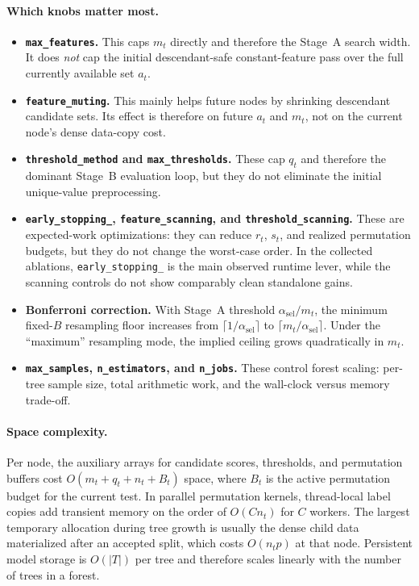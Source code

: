 \paragraph{Which knobs matter most.}
\begin{itemize}
  \item \textbf{\texttt{max\_features}.} This caps $m_t$ directly and therefore
  the Stage~A search width. It does \emph{not} cap the initial descendant-safe
  constant-feature pass over the full currently available set $a_t$.
  \item \textbf{\texttt{feature\_muting}.} This mainly helps future nodes by
  shrinking descendant candidate sets. Its effect is therefore on future $a_t$
  and $m_t$, not on the current node's dense data-copy cost.
  \item \textbf{\texttt{threshold\_method} and \texttt{max\_thresholds}.} These
  cap $q_t$ and therefore the dominant Stage~B evaluation loop, but they do
  not eliminate the initial unique-value preprocessing.
  \item \textbf{\texttt{early\_stopping\_\*}, \texttt{feature\_scanning}, and
  \texttt{threshold\_scanning}.} These are expected-work optimizations: they
  can reduce $r_t$, $s_t$, and realized permutation budgets, but they do not
  change the worst-case order. In the collected ablations,
  \texttt{early\_stopping\_\*} is the main observed runtime lever, while the
  scanning controls do not show comparably clean standalone gains.
  \item \textbf{Bonferroni correction.} With Stage~A threshold
  $\alpha_{\mathrm{sel}}/m_t$, the minimum fixed-$B$ resampling floor
  increases from $\lceil 1/\alpha_{\mathrm{sel}} \rceil$ to
  $\lceil m_t/\alpha_{\mathrm{sel}} \rceil$. Under the ``maximum'' resampling
  mode, the implied ceiling grows quadratically in $m_t$.
  \item \textbf{\texttt{max\_samples}, \texttt{n\_estimators}, and
  \texttt{n\_jobs}.} These control forest scaling: per-tree sample size, total
  arithmetic work, and the wall-clock versus memory trade-off.
\end{itemize}

\paragraph{Space complexity.}
Per node, the auxiliary arrays for candidate scores, thresholds, and
permutation buffers cost $O(m_t + q_t + n_t + B_t)$ space, where $B_t$ is the
active permutation budget for the current test. In parallel permutation
kernels, thread-local label copies add transient memory on the order of
$O(C n_t)$ for $C$ workers. The largest temporary allocation during tree
growth is usually the dense child data materialized after an accepted split,
which costs $O(n_t p)$ at that node. Persistent model storage is $O(|T|)$ per
tree and therefore scales linearly with the number of trees in a forest.
